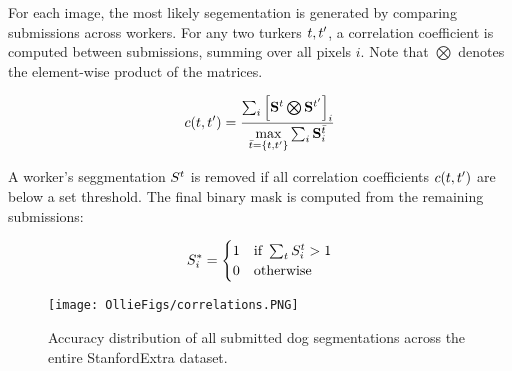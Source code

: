 


For each image, the most likely segementation is generated by comparing submissions across workers. For any two turkers $t, t'$, a correlation coefficient is computed between submissions, summing over all pixels $i$. Note that $\bigotimes$ denotes the element-wise product of the matrices.

\begin{equation}
c(t, t') = \frac{
    \sum_i \left[ \mathbf{S}^{t} \bigotimes \mathbf{S}^{t'} \right]_{i}}
    {\max\limits_{\bar{t} = \{t,t'\}} \sum_{i} \mathbf{S}^{\bar{t}}_{i}}
\end{equation}


A worker's seggmentation $S^{t}$ is removed if all correlation coefficients $c(t,t')$ are below a set threshold. The final binary mask is computed from the remaining submissions:

\begin{equation}
S^{*}_{i} = \begin{cases}
    1 & \text{if } \sum_{t} S^{t}_{i} > 1 \\
    0 & \text{otherwise}
\end{cases}
\end{equation}

\begin{figure}
\centering
\texttt{[image: OllieFigs/correlations.PNG]}
\caption{Accuracy distribution of all submitted dog segmentations across the entire StanfordExtra dataset.}
\label{fig:accuracy distribution}
\end{figure}


